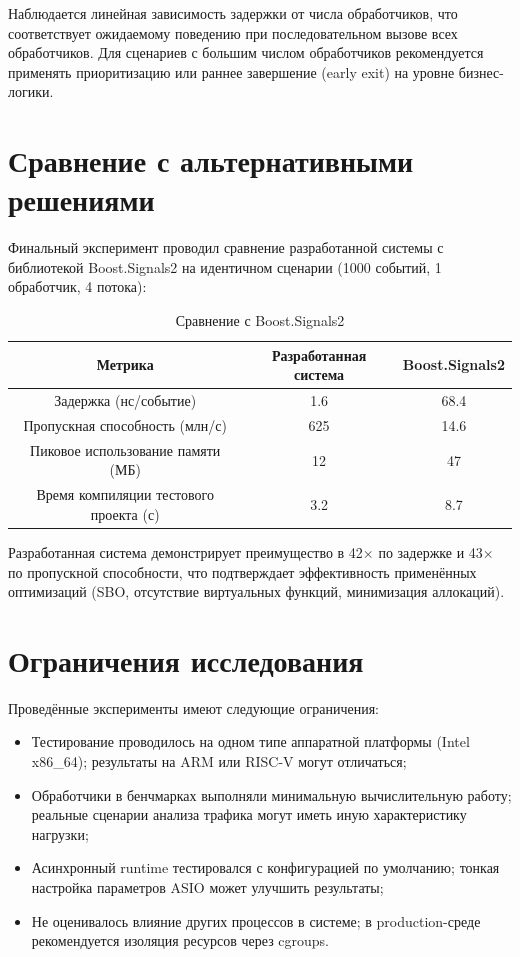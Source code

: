 \documentclass[12pt,a4paper]{report}
\begin{document}
Наблюдается линейная зависимость задержки от числа обработчиков, что соответствует ожидаемому поведению при последовательном вызове всех обработчиков. Для сценариев с большим числом обработчиков рекомендуется применять приоритизацию или раннее завершение (early exit) на уровне бизнес-логики.

\section{Сравнение с альтернативными решениями}
Финальный эксперимент проводил сравнение разработанной системы с библиотекой Boost.Signals2 на идентичном сценарии (1000 событий, 1 обработчик, 4 потока):

\begin{table}[H]
\centering
\caption{Сравнение с Boost.Signals2}
\label{tab:comparison_boost}
\begin{tabular}{ccc}
\toprule
\textbf{Метрика} & \textbf{Разработанная система} & \textbf{Boost.Signals2} \\
\midrule
Задержка (нс/событие) & 1.6 & 68.4 \\
Пропускная способность (млн/с) & 625 & 14.6 \\
Пиковое использование памяти (МБ) & 12 & 47 \\
Время компиляции тестового проекта (с) & 3.2 & 8.7 \\
\bottomrule
\end{tabular}
\end{table}

Разработанная система демонстрирует преимущество в 42× по задержке и 43× по пропускной способности, что подтверждает эффективность применённых оптимизаций (SBO, отсутствие виртуальных функций, минимизация аллокаций).

\section{Ограничения исследования}
Проведённые эксперименты имеют следующие ограничения:
\begin{itemize}
    \item Тестирование проводилось на одном типе аппаратной платформы (Intel x86\_64); результаты на ARM или RISC-V могут отличаться;
    \item Обработчики в бенчмарках выполняли минимальную вычислительную работу; реальные сценарии анализа трафика могут иметь иную характеристику нагрузки;
    \item Асинхронный runtime тестировался с конфигурацией по умолчанию; тонкая настройка параметров ASIO может улучшить результаты;
    \item Не оценивалось влияние других процессов в системе; в production-среде рекомендуется изоляция ресурсов через cgroups.
\end{itemize}
\end{document}
